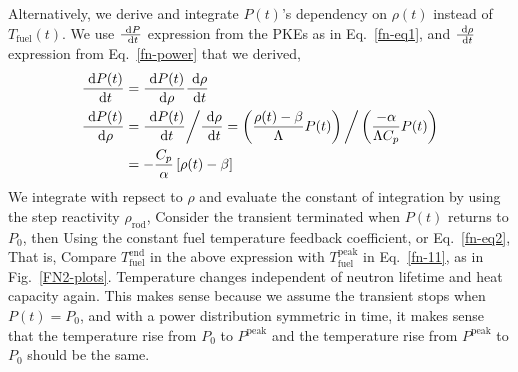 \documentclass{school-22.211-notes}
\begin{document}
Alternatively, we derive and integrate $P(t)$'s dependency on $\rho(t)$ instead of $T_{\mathrm{fuel}}(t)$. We use $\frac{\mbox{ }\mathrm{d} P}{\mbox{ }\mathrm{d} t}$ expression from the PKEs as in Eq.~\ref{fn-eq1}, and $\frac{\mbox{ }\mathrm{d} \rho}{\mbox{ }\mathrm{d} t}$ expression from Eq.~\ref{fn-power} that we derived, 
\begin{align}
\frac{\mbox{ }\mathrm{d} P(t)}{\mbox{ }\mathrm{d} t} &= \frac{\mbox{ }\mathrm{d} P(t)}{\mbox{ }\mathrm{d} \rho} \frac{\mbox{ }\mathrm{d} \rho}{\mbox{ }\mathrm{d} t}  \\
\frac{\mbox{ }\mathrm{d} P(t)}{\mbox{ }\mathrm{d} \rho} &=  \frac{\mbox{ }\mathrm{d} P(t)}{\mbox{ }\mathrm{d} t} \bigg/  \frac{\mbox{ }\mathrm{d} \rho}{\mbox{ }\mathrm{d} t}  
=   \left( \frac{\rho(t) - \beta}{\Lambda} P(t) \right) \bigg/ \left( \frac{-\alpha}{\Lambda C_p } P(t) \right) \\
&= - \frac{C_p}{\alpha} \left[ \rho(t) - \beta \right] 
\end{align}
We integrate with repsect to $\rho$ and evaluate the constant of integration by using the step reactivity $\rho_{\mathrm{rod}}$, 
Consider the transient terminated when $P(t)$ returns to $P_0$, then 
Using the constant fuel temperature feedback coefficient, or Eq.~\ref{fn-eq2}, 
That is, 
  Compare $T_{\mathrm{fuel}}^{\mathrm{end}}$ in the above expression with $T_{\mathrm{fuel}}^{\mathrm{peak}}$ in Eq.~\ref{fn-11},  as in Fig.~\ref{FN2-plots}. Temperature changes independent of neutron lifetime and heat capacity again. This makes sense because we assume the transient stops when $P(t) = P_0$, and with a power distribution symmetric in time, it makes sense that the temperature rise from $P_0$ to $P^{\mathrm{peak}}$ and the temperature rise from $P^{\mathrm{peak}}$ to $P_0$ should be the same. 
\end{document}
